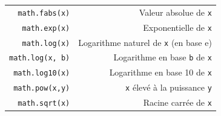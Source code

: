\documentclass[12pt,]{book}
\numberwithin{equation}{section}
\numberwithin{countremarque}{section}
\begin{document}
\begin{longtable}[]{@{}rr@{}}
\begin{minipage}[t]{0.21\columnwidth}
\texttt{math.fabs(x)}\strut
\end{minipage} & \begin{minipage}[t]{0.60\columnwidth}\raggedleft\strut
Valeur absolue de \texttt{x}\strut
\end{minipage}\tabularnewline
\begin{minipage}[t]{0.21\columnwidth}\raggedleft\strut
\texttt{math.exp(x)}\strut
\end{minipage} & \begin{minipage}[t]{0.60\columnwidth}\raggedleft\strut
Exponentielle de \texttt{x}\strut
\end{minipage}\tabularnewline
\begin{minipage}[t]{0.21\columnwidth}\raggedleft\strut
\texttt{math.log(x)}\strut
\end{minipage} & \begin{minipage}[t]{0.60\columnwidth}\raggedleft\strut
Logarithme naturel de \texttt{x} (en base e)\strut
\end{minipage}\tabularnewline
\begin{minipage}[t]{0.21\columnwidth}\raggedleft\strut
\texttt{math.log(x,\ b)}\strut
\end{minipage} & \begin{minipage}[t]{0.60\columnwidth}\raggedleft\strut
Logarithme en base \texttt{b} de \texttt{x}\strut
\end{minipage}\tabularnewline
\begin{minipage}[t]{0.21\columnwidth}\raggedleft\strut
\texttt{math.log10(x)}\strut
\end{minipage} & \begin{minipage}[t]{0.60\columnwidth}\raggedleft\strut
Logarithme en base 10 de \texttt{x}\strut
\end{minipage}\tabularnewline
\begin{minipage}[t]{0.21\columnwidth}\raggedleft\strut
\texttt{math.pow(x,y)}\strut
\end{minipage} & \begin{minipage}[t]{0.60\columnwidth}\raggedleft\strut
\texttt{x} élevé à la puissance \texttt{y}\strut
\end{minipage}\tabularnewline
\begin{minipage}[t]{0.21\columnwidth}\raggedleft\strut
\texttt{math.sqrt(x)}\strut
\end{minipage} & \begin{minipage}[t]{0.60\columnwidth}\raggedleft\strut
Racine carrée de \texttt{x}\strut
\end{minipage}\tabularnewline

\end{longtable}
\end{document}
